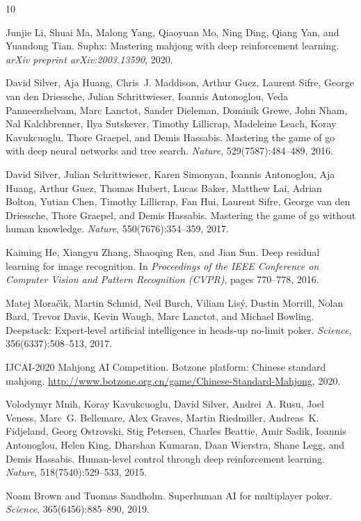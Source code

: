\documentclass{article}
\begin{document}

\begin{thebibliography}{10}

Junjie Li, Shuai Ma, Malong Yang, Qiaoyuan Mo, Ning Ding, Qiang Yan, and Yuandong Tian.
\newblock Suphx: Mastering mahjong with deep reinforcement learning.
\newblock \textit{arXiv preprint arXiv:2003.13590}, 2020.

David Silver, Aja Huang, Chris~J. Maddison, Arthur Guez, Laurent Sifre,
  George van den Driessche, Julian Schrittwieser, Ioannis Antonoglou,
  Veda Panneershelvam, Marc Lanctot, Sander Dieleman, Dominik Grewe,
  John Nham, Nal Kalchbrenner, Ilya Sutskever, Timothy Lillicrap, Madeleine Leach,
  Koray Kavukcuoglu, Thore Graepel, and Demis Hassabis.
\newblock Mastering the game of go with deep neural networks and tree search.
\newblock \textit{Nature}, 529(7587):484--489, 2016.

David Silver, Julian Schrittwieser, Karen Simonyan, Ioannis Antonoglou,
  Aja Huang, Arthur Guez, Thomas Hubert, Lucas Baker, Matthew Lai,
  Adrian Bolton, Yutian Chen, Timothy Lillicrap, Fan Hui, Laurent Sifre,
  George van den Driessche, Thore Graepel, and Demis Hassabis.
\newblock Mastering the game of go without human knowledge.
\newblock \textit{Nature}, 550(7676):354--359, 2017.

Kaiming He, Xiangyu Zhang, Shaoqing Ren, and Jian Sun.
\newblock Deep residual learning for image recognition.
\newblock In \textit{Proceedings of the IEEE Conference on Computer Vision and
  Pattern Recognition (CVPR)}, pages 770--778, 2016.

Matej Mora{\v{c}}{\'\i}k, Martin Schmid, Neil Burch, Viliam Lis{\'y},
  Dustin Morrill, Nolan Bard, Trevor Davis, Kevin Waugh, Marc Lanctot,
  and Michael Bowling.
\newblock Deepstack: Expert-level artificial intelligence in heads-up no-limit poker.
\newblock \textit{Science}, 356(6337):508--513, 2017.

{IJCAI-2020 Mahjong AI Competition}.
\newblock Botzone platform: Chinese standard mahjong.
\newblock \url{http://www.botzone.org.cn/game/Chinese-Standard-Mahjong}, 2020.

Volodymyr Mnih, Koray Kavukcuoglu, David Silver, Andrei~A. Rusu, Joel Veness,
  Marc~G. Bellemare, Alex Graves, Martin Riedmiller, Andreas~K. Fidjeland,
  Georg Ostrovski, Stig Petersen, Charles Beattie, Amir Sadik, Ioannis Antonoglou,
  Helen King, Dharshan Kumaran, Daan Wierstra, Shane Legg, and Demis Hassabis.
\newblock Human-level control through deep reinforcement learning.
\newblock \textit{Nature}, 518(7540):529--533, 2015.

Noam Brown and Tuomas Sandholm.
\newblock Superhuman {AI} for multiplayer poker.
\newblock \textit{Science}, 365(6456):885--890, 2019.

\end{thebibliography}
\end{document}
